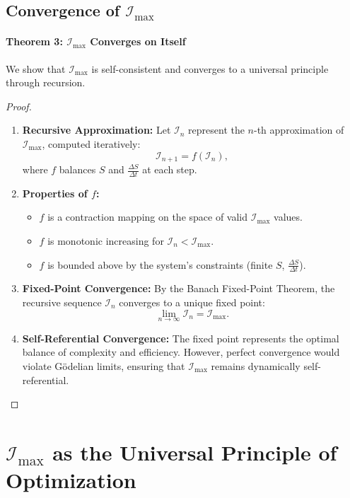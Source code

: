 \documentclass[12pt]{article}
\begin{document}
\subsection{Convergence of \(\mathcal{I}_{\text{max}}\)}

\paragraph{Theorem 3: \(\mathcal{I}_{\text{max}}\) Converges on Itself}
We show that \(\mathcal{I}_{\text{max}}\) is self-consistent and converges to a universal principle through recursion.

\begin{proof}
\begin{enumerate}
    \item \textbf{Recursive Approximation:}
    Let \(\mathcal{I}_n\) represent the \(n\)-th approximation of \(\mathcal{I}_{\text{max}}\), computed iteratively:
    \[
    \mathcal{I}_{n+1} = f(\mathcal{I}_n),
    \]
    where \(f\) balances \(S\) and \(\frac{\Delta S}{\Delta t}\) at each step.

    \item \textbf{Properties of \(f\):}
    \begin{itemize}
        \item \(f\) is a contraction mapping on the space of valid \(\mathcal{I}_{\text{max}}\) values.
        \item \(f\) is monotonic increasing for \(\mathcal{I}_n < \mathcal{I}_{\text{max}}\).
        \item \(f\) is bounded above by the system's constraints (finite \(S\), \(\frac{\Delta S}{\Delta t}\)).
    \end{itemize}

    \item \textbf{Fixed-Point Convergence:}
    By the Banach Fixed-Point Theorem, the recursive sequence \(\mathcal{I}_n\) converges to a unique fixed point:
    \[
    \lim_{n \to \infty} \mathcal{I}_n = \mathcal{I}_{\text{max}}.
    \]

    \item \textbf{Self-Referential Convergence:}
    The fixed point represents the optimal balance of complexity and efficiency. However, perfect convergence would violate Gödelian limits, ensuring that \(\mathcal{I}_{\text{max}}\) remains dynamically self-referential.
\end{enumerate}
\end{proof}

\section{\(\mathcal{I}_{\text{max}}\) as the Universal Principle of Optimization}
\end{document}
